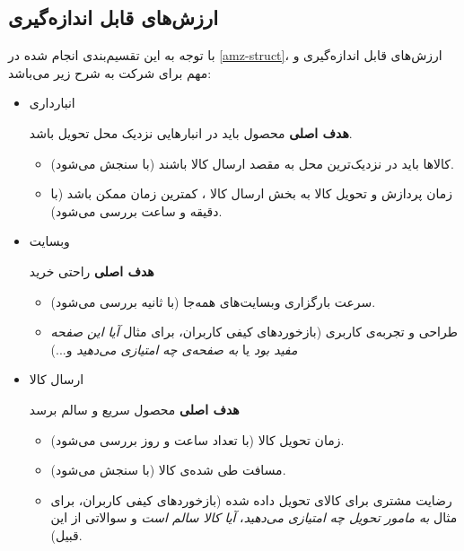\documentclass[12pt, dvipsnames, svgnames, x11names,]{article}
\begin{document}
\subsection{ارزش‌های قابل‌ اندازه‌گیری}\label{intro-movs}
با توجه به این تقسیم‌بندی انجام شده در \ref{amz-struct}، ارزش‌های قابل‌ اندازه‌گیری \label{movs}
و مهم برای شرکت  به شرح زیر می‌باشد:

\begin{itemize}
    \item  انبارداری 
    
    \textbf{هدف اصلی} محصول باید در انبار‌هایی نزدیک محل تحویل باشد.
    \begin{itemize}
        \item 
        کالا‌ها باید در نزدیک‌ترین محل به مقصد ارسال کالا باشند (با سنجش می‌شود).
        
        \item 
        زمان پردازش و تحویل کالا به بخش ارسال کالا ، کمترین زمان ممکن باشد (با دقیقه و ساعت بررسی می‌شود).        
    \end{itemize}
    
    \item وبسایت  
    
    \textbf{هدف اصلی} راحتی خرید
    \begin{itemize}
        \item سرعت بارگزاری وبسایت‌های  همه‌جا (با ثانیه بررسی می‌شود).
        
        \item 
        طراحی و تجربه‌ی کاربری  (بازخورد‌های کیفی کاربران، برای مثال \textit{آیا این صفحه مفید بود} یا \textit{به صفحه‌ی  چه امتیازی می‌دهید} و...)
    \end{itemize}

    \item ارسال کالا 
    
    \textbf{هدف اصلی} محصول سریع و سالم برسد
    \begin{itemize}
        \item 
        زمان تحویل کالا (با تعداد ساعت و روز بررسی می‌شود).
        \item 
        مسافت طی شده‌ی کالا (با  سنجش می‌شود).
        
        \item 
        رضایت مشتری برای کالای تحویل داده شده (بازخورد‌های کیفی کاربران، برای مثال 
        \textit{به مامور تحویل چه امتیازی می‌دهید}،
        \textit{آیا کالا سالم است} و سوالاتی از این قبیل).
    \end{itemize}
\end{itemize}
\end{document}
